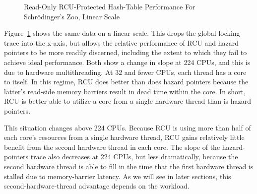 \begin{figure}[tb]
\centering
{}
\caption{Read-Only RCU-Protected Hash-Table Performance For Schr\"odinger's Zoo, Linear Scale}
\label{fig:datastruct:Read-Only RCU-Protected Hash-Table Performance For Schroedinger's Zoo, Linear Scale}
\end{figure}

Figure~\ref{fig:datastruct:Read-Only RCU-Protected Hash-Table Performance For Schroedinger's Zoo, Linear Scale}
shows the same data on a linear scale.
This drops the global-locking trace into the x-axis, but allows the
relative performance of RCU and hazard pointers to be more readily
discerned, including the extent to which they fail to achieve ideal
performance.
Both show a change in slope at 224 CPUs, and this is due to hardware
multithreading.
At 32 and fewer CPUs, each thread has a core to itself.
In this regime, RCU does better than does hazard pointers because the
latter's read-side memory barriers result in dead time within the core.
In short, RCU is better able to utilize a core from a single hardware
thread than is hazard pointers.

This situation changes above 224 CPUs.
Because RCU is using more than half of each core's resources from a
single hardware thread, RCU gains relatively little benefit from the
second hardware thread in each core.
The slope of the hazard-pointers trace also decreases at 224 CPUs, but
less dramatically,
because the second hardware thread is able to fill in the time
that the first hardware thread is stalled due to memory-barrier latency.
As we will see in later sections, this second-hardware-thread
advantage depends on the workload.

